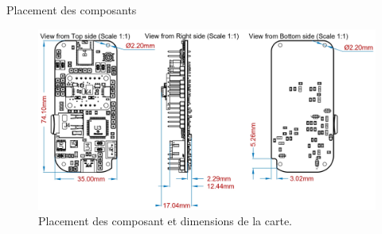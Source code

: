 \documentclass{beamer}
\begin{document}
\begin{frame}{Placement des composants}
	\begin{figure}[h]
		\centering
		\includegraphics[width=.83\linewidth]{../figures/dev-pcb/PCB-Dims.jpg}
		\caption{Placement des composant et dimensions de la carte.}
		\label{fig:pcb-dims}
	\end{figure}
\end{frame}
\end{document}
